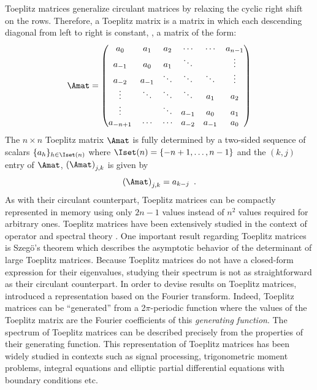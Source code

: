 Toeplitz matrices generalize circulant matrices by relaxing the cyclic right shift on the rows.
Therefore, a Toeplitz matrix is a matrix in which each descending diagonal from left to right is constant, \ie, a matrix of the form:
\begin{equation}
  \Amat =
  \leftmatrix
    a_0      & a_1    & a_{2}  & \cdots & \cdots & a_{n-1} \\
    a_{-1}   & a_0    & a_{1}  & \ddots &        & \vdots  \\
    a_{-2}   & a_{-1} & \ddots & \ddots & \ddots & \vdots  \\
    \vdots   & \ddots & \ddots & \ddots & a_{1}  & a_2     \\
    \vdots   &        & \ddots & a_{-1} & a_{0}  & a_1     \\
    a_{-n+1} & \cdots & \cdots & a_{-2} & a_{-1} & a_0
  \rightmatrix
\end{equation}
\noindent
The $n \times n$ Toeplitz matrix $\Amat$ is fully determined by a two-sided sequence of scalars $\{a_h\}_{h \in \Iset(n)}$ where $\Iset(n) = \{-n+1, \dots, n-1\}$ and the $(k,j)$ entry of $\Amat$, $\leftmat \Amat \rightmat_{j,k}$ is given by
\begin{equation}
  \leftmat \Amat \rightmat_{j,k} = a_{k-j} \enspace.
\end{equation}
\noindent
As with their circulant counterpart, Toeplitz matrices can be compactly represented in memory using only $2n-1$ values instead of $n^2$ values required for arbitrary ones.
Toeplitz matrices have been extensively studied in the context of operator and spectral theory \cite{grenander1958toeplitz,widom1965toeplitz,bottcher2012introduction}.
One important result regarding Toeplitz matrices is Szeg\"{o}'s theorem \cite{szego1915grenzwertsatz} which describes the asymptotic behavior of the determinant of large Toeplitz matrices.
Because Toeplitz matrices do not have a closed-form expression for their eigenvalues, studying their spectrum is not as straightforward as their circulant counterpart.
In order to devise results on Toeplitz matrices, \citet{grenander1958toeplitz} introduced a representation based on the Fourier transform.
Indeed, Toeplitz matrices can be ``generated'' from a 2$\pi$-periodic function where the values of the Toeplitz matrix are the Fourier coefficients of this \emph{generating function}.
The spectrum of Toeplitz matrices can be described precisely from the properties of their generating function.
This representation of Toeplitz matrices has been widely studied in contexts such as signal processing, trigonometric moment problems, integral equations and elliptic partial differential equations with boundary conditions etc. \cite{serra1997extension,parter1961extreme,avram1988bilinear,widom1965toeplitz,tilli1997asymptotic,tyrtyshnikov1998spectra,tilli1998singular,tilli1997asymptotic} 



